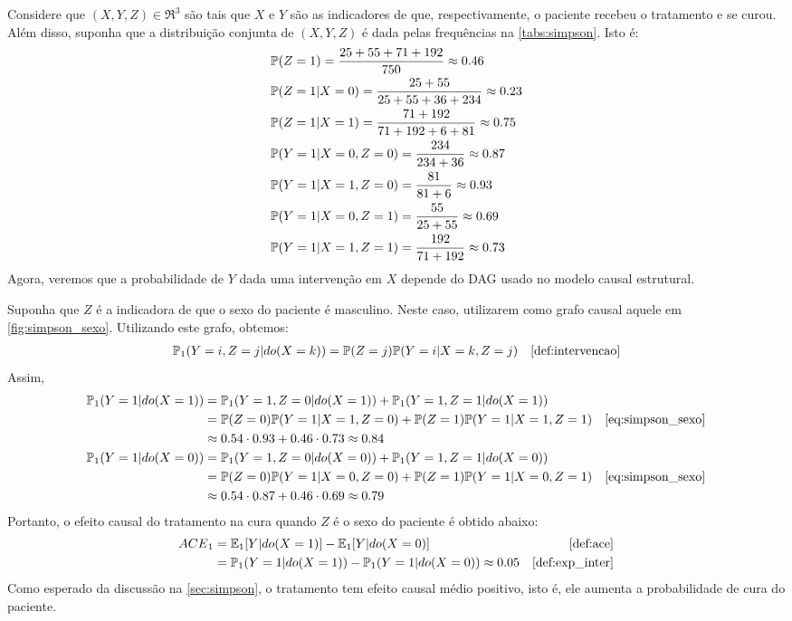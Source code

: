 \begin{example}
 \label{ex:simpson_fim}
 Considere que $(X,Y,Z) \in \Re^3$ são tais que
 $X$ e $Y$ são as indicadores de que, respectivamente, 
 o paciente recebeu o tratamento e se curou. 
 Além disso, suponha que a distribuição conjunta de $(X,Y,Z)$ é
 dada pelas frequências na \cref{tabs:simpson}. Isto é:
 \begin{align*}
  &\P(Z = 1) = \frac{25+55+71+192}{750} \approx 0.46 \\
  &\P(Z = 1|X = 0) = \frac{25+55}{25+55+36+234} \approx 0.23 \\
  &\P(Z = 1|X = 1) = \frac{71+192}{71+192+6+81} \approx 0.75 \\
  &\P(Y = 1|X = 0, Z = 0) = \frac{234}{234+36} \approx 0.87 \\
  &\P(Y = 1|X = 1, Z = 0) = \frac{81}{81+6} \approx 0.93 \\
  &\P(Y = 1|X = 0, Z = 1) = \frac{55}{25+55} \approx 0.69 \\
  &\P(Y = 1|X = 1, Z = 1) = \frac{192}{71+192} \approx 0.73
 \end{align*}
 Agora, veremos que a probabilidade de $Y$ 
 dada uma intervenção em $X$ depende do DAG usado
 no modelo causal estrutural.
 
 Suponha que $Z$ é a indicadora de que 
 o sexo do paciente é masculino.
 Neste caso, utilizarem como 
 grafo causal aquele em \cref{fig:simpson_sexo}.
 Utilizando este grafo, obtemos:
 \begin{align}
  \label{eq:simpson_sexo}
  \P_1(Y=i,Z=j|do(X=k))
  &= \P(Z=j)\P(Y=i|X=k,Z=j) 
  & \text{\cref{def:intervencao}}
 \end{align}
 Assim,
 \begin{align*}
  \P_1(Y=1|do(X=1))
  &= \P_1(Y=1,Z=0|do(X=1)) + \P_1(Y=1,Z=1|do(X=1)) \\
  &= \P(Z=0)\P(Y=1|X=1,Z=0) + \P(Z=1)\P(Y=1|X=1,Z=1)
  & \text{\cref{eq:simpson_sexo}} \\
  &\approx 0.54 \cdot 0.93 + 0.46 \cdot 0.73 \approx 0.84 \\
  \P_1(Y=1|do(X=0))
  &= \P_1(Y=1,Z=0|do(X=0)) + \P_1(Y=1,Z=1|do(X=0)) \\
  &= \P(Z=0)\P(Y=1|X=0,Z=0) + \P(Z=1)\P(Y=1|X=0,Z=1)
  & \text{\cref{eq:simpson_sexo}} \\
  &\approx 0.54 \cdot 0.87 + 0.46 \cdot 0.69 \approx 0.79 \\
 \end{align*}
 Portanto, o efeito causal do tratamento na cura quando
 $Z$ é o sexo do paciente é obtido abaixo:
 \begin{align*}
  \ACE_1 &= \E_1[Y|do(X=1)] - \E_1[Y|do(X=0)] 
  & \text{\cref{def:ace}} \\
  &= \P_1(Y=1|do(X=1)) - \P_1(Y=1|do(X=0)) \approx 0.05
  & \text{\cref{def:exp_inter}}
 \end{align*}
 Como esperado da discussão na \cref{sec:simpson},
 o tratamento tem efeito causal médio positivo, isto é,
 ele aumenta a probabilidade de cura do paciente.
 

\end{example}
